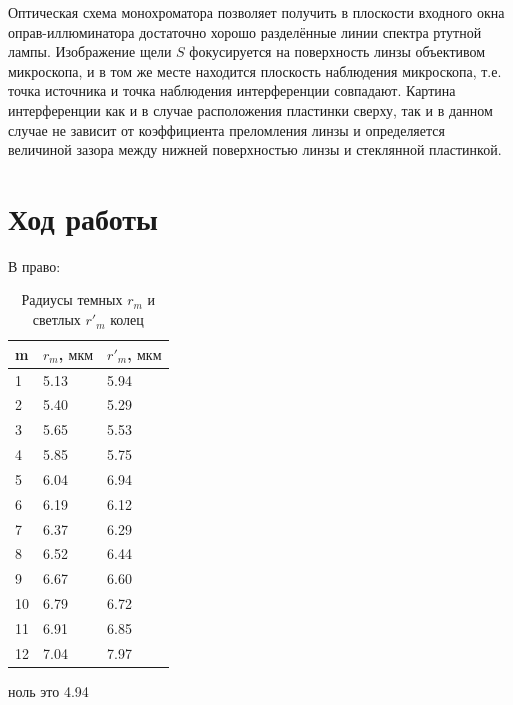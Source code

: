 \documentclass[a4paper]{article}
\begin{document}
Оптическая схема монохроматора позволяет получить в плоскости входного окна оправ-иллюминатора достаточно хорошо разделённые линии спектра ртутной лампы. Изображение щели $S$ фокусируется на поверхность линзы объективом микроскопа, и в том же месте находится плоскость наблюдения микроскопа, т.е. точка источника и точка наблюдения интерференции совпадают. Картина интерференции как и в случае расположения пластинки сверху, так и в данном случае не зависит от коэффициента преломления линзы и определяется величиной зазора между нижней поверхностью линзы и стеклянной пластинкой.

\section{Ход работы}
В право: 
\begin{table}[h]
    \centering
    \begin{tabular}{|l|l|l|} %
        \hline
        \textbf{m} & \textbf{$r_m$, $\text{мкм}$} &\textbf{$r'_m$, $\text{мкм}$} \\
        \hline
        1 & 5.13 & 5.94 \\
        \hline
        2 & 5.40 & 5.29\\
        \hline
        3 & 5.65  & 5.53\\
        \hline
        4 & 5.85 &5.75 \\
        \hline
        5 &6.04 &6.94\\
        \hline
        6 &6.19 &6.12\\
        \hline
        7 & 6.37 &6.29\\
        \hline
        8 & 6.52 &6.44\\
        \hline
        9 & 6.67 &6.60\\
        \hline
         10& 6.79 &6.72\\
         \hline
          11& 6.91 &6.85\\
          \hline
         12& 7.04 &7.97\\
        \hline
    \end{tabular}
    \caption{Радиусы темных $r_m$ и светлых $r'_m$ колец }
\end{table}
ноль это 4.94
\newpage
\end{document}
